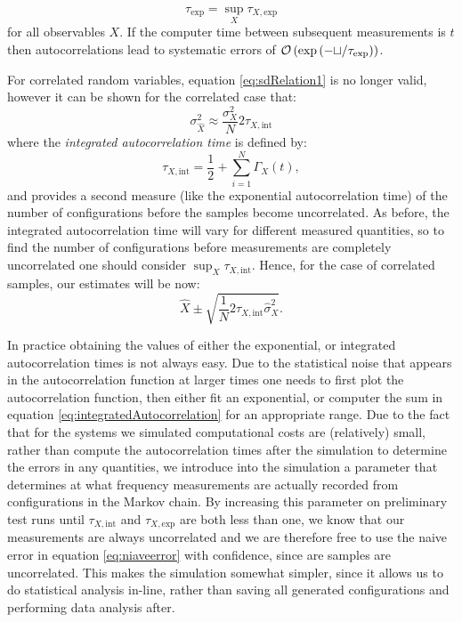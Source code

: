 \documentclass[12pt]{article}
\begin{document}
            \begin{equation}
                \tau_{\text{exp}}=\sup_{X} \tau_{X,\text{exp}}
            \end{equation}
            for all observables $X$. If the computer time between subsequent measurements is $t$ then autocorrelations lead to systematic errors of $\cal{O}\left(\exp{\left( - t / \tau_{\text{exp}}\right)}\right)$\cite{gattringer_lang_2013}.

            For correlated random variables, equation \ref{eq:sdRelation1} is no longer valid, however it can be shown for the correlated case \cite{gattringer_lang_2013} that:
            \begin{equation}
                \sigma_{\hat{X}}^2 \approx \frac{\sigma_X^2}{N} 2 \tau_{X,\text{int}}
            \end{equation}
            where the \textit{integrated autocorrelation time} is defined by:
            \begin{equation}
                \label{eq:integratedAutocorrelation}
                \tau_{X,\text{int}} = \frac{1}{2} + \sum_{i=1}^{N}\Gamma_{X}\left(t\right),
            \end{equation}
            and provides  a second measure (like the exponential autocorrelation time) of the number of configurations before the samples become uncorrelated. As before, the integrated autocorrelation time will vary for different measured quantities, so to find the number of configurations before measurements are completely uncorrelated one should consider $\sup_X{\tau_{X,\text{int}}}$.
            Hence, for the case of correlated samples, our estimates will be now:
            \begin{equation}
                \hat{X}\pm\sqrt{\frac{1}{N}2\tau_{X,\text{int}}\hat{\sigma}^{2}_{X}}.
            \end{equation}

            In practice obtaining the values of either the exponential, or integrated autocorrelation times is not always easy. Due to the statistical noise that appears in the autocorrelation function at larger times one needs to first plot the autocorrelation function, then either fit an exponential, or computer the sum in equation \ref{eq:integratedAutocorrelation} for an appropriate range. Due to the fact that for the systems we simulated computational costs are (relatively) small, rather than compute the autocorrelation times after the simulation to determine the errors in any quantities, we introduce into the simulation a parameter that determines at what frequency measurements are actually recorded from configurations in the Markov chain. By increasing this parameter on preliminary test runs until $\tau_{X,\text{int}}$ and $\tau_{X,\text{exp}}$ are both less than one, we know that our measurements are always uncorrelated and we are therefore free to use the naive error in equation \ref{eq:niaveerror} with confidence, since are samples are uncorrelated. This makes the simulation somewhat simpler, since it allows us to do statistical analysis in-line, rather than saving all generated configurations and performing data analysis after. 
\end{document}
